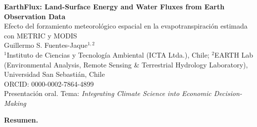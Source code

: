 \documentclass[11pt,a4paper]{article}
\begin{document}
\begin{center}
{\Large\bfseries EarthFlux: Land-Surface Energy and Water Fluxes from Earth Observation Data}\\[3pt]
{\large Efecto del forzamiento meteorológico espacial en la evapotranspiración estimada con METRIC y MODIS}\\[6pt]
Guillermo S. Fuentes-Jaque$^{1,2}$\\
{\small $^{1}$Instituto de Ciencias y Tecnología Ambiental (ICTA Ltda.), Chile; $^{2}$EARTH Lab (Environmental Analysis, Remote Sensing \& Terrestrial Hydrology Laboratory), Universidad San Sebastián, Chile}\\[2pt]
{\small ORCID: 0000-0002-7864-4899}\\[4pt]
{\small Presentación oral. Tema: \textit{Integrating Climate Science into Economic Decision-Making}}
\end{center}

\textbf{Resumen.} 
\end{document}
